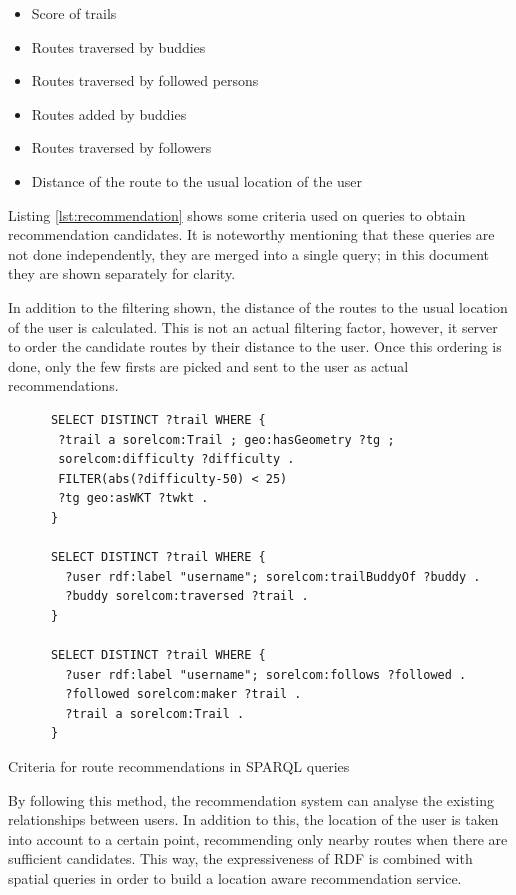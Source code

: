 \begin{itemize}
\item Score of trails
\item Routes traversed by buddies
\item Routes traversed by followed persons
\item Routes added by buddies
\item Routes traversed by followers
\item Distance of the route to the usual location of the user
\end{itemize} 

Listing \ref{lst:recommendation} shows some criteria used on queries to obtain recommendation candidates. It is noteworthy mentioning that these queries are not done independently, they are merged into a single query; in this document they are shown separately for clarity. 

In addition to the filtering shown, the distance of the routes to the usual location of the user is calculated. This is not an actual filtering factor, however, it server to order the candidate routes by their distance to the user. Once this ordering is done, only the few firsts are picked and sent to the user as actual recommendations. 

\begin{listing}[ht]\centering
  \begin{minipage}{.7\textwidth}
    \begin{verbatim}
      SELECT DISTINCT ?trail WHERE {
       ?trail a sorelcom:Trail ; geo:hasGeometry ?tg ;
       sorelcom:difficulty ?difficulty .
       FILTER(abs(?difficulty-50) < 25)
       ?tg geo:asWKT ?twkt .
      }
      
      SELECT DISTINCT ?trail WHERE {
        ?user rdf:label "username"; sorelcom:trailBuddyOf ?buddy .
        ?buddy sorelcom:traversed ?trail .
      }
      
      SELECT DISTINCT ?trail WHERE {
        ?user rdf:label "username"; sorelcom:follows ?followed .
        ?followed sorelcom:maker ?trail .
        ?trail a sorelcom:Trail .
      }
    \end{verbatim}
  \end{minipage}
  \caption{Criteria for route recommendations in SPARQL queries}\label{lst:recommendation}
\end{listing}

By following this method, the recommendation system can analyse the existing relationships between users. In addition to this, the location of the user is taken into account to a certain point, recommending only nearby routes when there are sufficient candidates. This way, the expressiveness of RDF is combined with spatial queries in order to build a location aware recommendation service.

